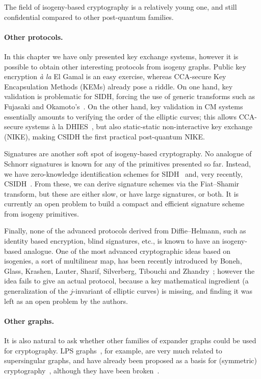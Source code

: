 \documentclass{report}
\theoremstyle{plain}
\theoremstyle{definition}
\begin{document}
The field of isogeny-based cryptography is a relatively young one, and
still confidential compared to other post-quantum families. %

\paragraph{Other protocols.}
In this chapter we have only presented key exchange systems, however
it is possible to obtain other interesting protocols from isogeny
graphs. %
Public key encryption \emph{à la} El Gamal is an easy exercise,
whereas CCA-secure Key Encapsulation Methods (KEMs) already pose a
riddle. %
On one hand, key validation is problematic for SIDH, forcing the use
of generic transforms such as Fujasaki and
Okamoto's~\cite{10.1007/3-540-48405-1_34}. %
On the other hand, key validation in CM systems essentially amounts to
verifying the order of the elliptic curves; this allows CCA-secure
systems à la
DHIES~\cite{cryptoeprint:1999:007,10.1007/3-540-45353-9_12,doi:10.1137/S0097539702403773},
but also static-static non-interactive key exchange (NIKE), making
CSIDH the first practical post-quantum NIKE. %

Signatures are another soft spot of isogeny-based cryptography. %
No analogue of Schnorr signatures is known for any of the primitives
presented so far. %
Instead, we have zero-knowledge identification schemes for
SIDH~\cite{defeo+jao+plut12,cryptoeprint:2017:186,cryptoeprint:2016:1154}
and, very recently, CSIDH~\cite{cryptoeprint:2018:824}. %
From these, we can derive signature schemes via the Fiat--Shamir
transform, but these are either slow, or have large signatures, or
both. %
It is currently an open problem to build a compact and efficient
signature scheme from isogeny primitives. %

Finally, none of the advanced protocols derived from Diffie--Helmann,
such as identity based encryption, blind signatures, etc., is known to
have an isogeny-based analogue. %
One of the most advanced cryptographic ideas based on isogenies, a
sort of multilinear map, has been recently introduced by Boneh, Glass,
Krashen, Lauter, Sharif, Silverberg, Tibouchi and
Zhandry~\cite{Boneh2018}; however the idea fails to give an actual
protocol, because a key mathematical ingredient (a generalization of
the $j$-invariant of elliptic curves) is missing, and finding it was
left as an open problem by the authors.

\paragraph{Other graphs.}
It is also natural to ask whether other families of expander graphs
could be used for cryptography. %
LPS graphs~\cite{LubPS}, for example, are very much related to
supersingular graphs, and have already been proposed as a basis for
(symmetric) cryptography~\cite{charles+lauter+goren09}, although they
have been broken~\cite{tillich2008collisions,quis}. %
\end{document}
